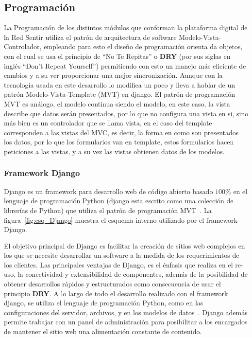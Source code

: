 \documentclass[journal,transmag]{IEEEtran}
\begin{document}
\subsection{Programación}
La Programación de los distintos módulos que conforman la plataforma digital de la Red Sentir utiliza el patrón de arquitectura de software Modelo-Vista-Controlador, empleando para esto el diseño de programación orienta da objetos, con el cual se usa el principio de ``No Te Repitas'' o \textbf{DRY} (por sus siglas en inglés ``Don't Repeat Yourself'') permitiendo con esto un manejo más eficiente de cambios y a su ver proporcionar una mejor sincronización. Aunque con la tecnología usada en este desarrollo lo modifica un poco y lleva a hablar de un patrón Modelo-Vista-Template (MVT) en django. El patrón de programación MVT es análogo, el modelo continua siendo el modelo, en este caso, la vista describe que datos serán presentados, por lo que no configura una vista en si, sino más bien es un controlador que se llama vista, en el caso del template corresponden a las vistas del MVC, es decir, la forma en como son presentados los datos, por lo que los formularios van en template, estos formularios hacen peticiones a las vistas, y a su vez las vistas obtienen datos de los modelos.

\subsubsection{Framework Django}
Django es un framework para desarrollo web de código abierto basado $100\%$ en el lenguaje de programación Python (django esta escrito como una colección de librerías de Python) que utiliza el patrón de programación MVT~\cite{Hol2009, DjangoM}. La figura~\ref{fig:esq_Django} muestra el esquema interno utilizado por el framework Django.

El objetivo principal de Django es facilitar la creación de sitios web complejos en los que se necesite desarrollar un software a la medida de los requerimientos de los clientes. Las principales ventajas de Django, es el énfasis que realiza en el re-uso, la conectividad y extensibilidad de componentes, además de la posibilidad de obtener desarrollos rápidos y estructurados como consecuencia de usar el principio \textbf{DRY}. A lo largo de todo el desarrollo realizado con el framework django, se utiliza el lenguaje de programación Python, como en las configuraciones del servidor, archivos, y en los modelos de datos~\cite{Wik2014}. Django además permite trabajar con un panel de administración para posibilitar a los encargados de mantener el sitio web una alimentación constante de contenido.
\end{document}
